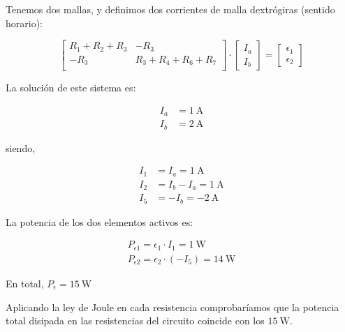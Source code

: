 Tenemos dos mallas, y definimos dos corrientes de malla dextrógiras (sentido horario):

\begin{equation*}
  \begin{bmatrix}
    R_1 + R_2 + R_3 & -R_3\\
    -R_3 & R_3 + R_4 + R_6 + R_7\\
  \end{bmatrix} \cdot %
  \begin{bmatrix}
    I_a\\
    I_b
  \end{bmatrix} = %
  \begin{bmatrix}
    \epsilon_1\\
    \epsilon_2
  \end{bmatrix}
\end{equation*}

\vspace{3mm}
La solución de este sistema es:

\vspace{-5mm}
\begin{align*}
  I_a &= \qty{1}{\ampere}\\
  I_b &= \qty{2}{\ampere}
\end{align*}

\vspace{-1mm}
siendo,

\vspace{-5mm}
\begin{align*}
  I_1 &= I_a = \boxed{\qty{1}{\ampere}}\\
  I_2 &= I_b - I_a = \boxed{\qty{1}{\ampere}}\\
  I_5 &= -I_b = \boxed{\qty{-2}{\ampere}}
\end{align*}

\vspace{2mm}
La potencia de los dos elementos activos es:

\vspace{-4mm}
\begin{align*}
  P_{\epsilon1} = \epsilon_1 \cdot I_1 = \qty{1}{\watt}\\
  P_{\epsilon2} = \epsilon_2 \cdot (-I_5) = \qty{14}{\watt}
\end{align*}

En total, $P_\epsilon = \boxed{\qty{15}{\watt}}$

\vspace{3mm}
Aplicando la ley de Joule en cada resistencia comprobaríamos que la potencia total disipada en las resistencias del circuito coincide con los $\qty{15}{\watt}$.


